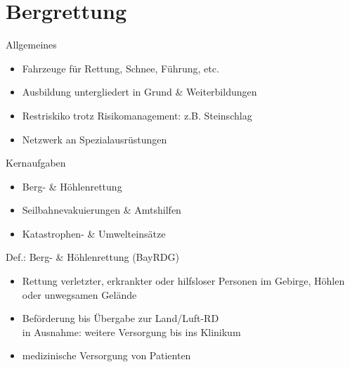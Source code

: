 \section{Bergrettung}
\begin{sectionbox}{Allgemeines}
    \begin{itemize}
        \item Fahrzeuge für Rettung, Schnee, Führung, etc. 
        \item Ausbildung untergliedert in Grund \& Weiterbildungen
        \item Restriskiko trotz Risikomanagement: z.B. Steinschlag
        \item Netzwerk an Spezialausrüstungen
    \end{itemize}
\end{sectionbox}
\begin{sectionbox}{Kernaufgaben}
    \begin{itemize}
        \item Berg- \& Höhlenrettung
        \item Seilbahnevakuierungen \& Amtshilfen
        \item Katastrophen- \& Umwelteinsätze 
    \end{itemize}
\end{sectionbox}
\begin{warningbox}{Def.: Berg- \& Höhlenrettung (BayRDG)}
    \begin{itemize}
        \item Rettung verletzter, erkrankter oder hilfsloser Personen im Gebirge, Höhlen oder unwegsamen Gelände
        \item Beförderung bis Übergabe zur Land/Luft-RD\\
        \ra in Ausnahme: weitere Versorgung bis ins Klinikum
        \item medizinische Versorgung von Patienten
    \end{itemize}
\end{warningbox}